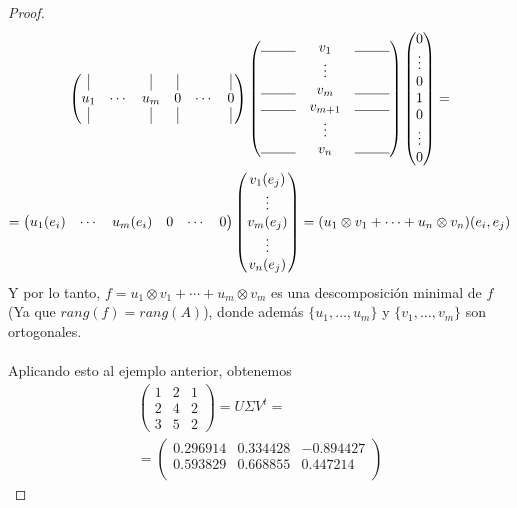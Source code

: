 \documentclass[12pt]{article}
\theoremstyle{break}
\newtheorem*{proof}{Demostración}
\begin{document}
\begin{proof}
\begin{gather*}
\begin{pmatrix}
		\vline & & \vline & \vline & & \vline \\
		u_1 & \cdots & u_m & 0 & \cdots & 0 \\
		\vline & & \vline & \vline & & \vline
		\end{pmatrix} \begin{pmatrix}
		\line(1,0){25} & v_1 & \line(1,0){25} \\
		& \vdots & \\
		\line(1,0){25} & v_m & \line(1,0){25} \\
		\line(1,0){25} & v_{m+1} & \line(1,0){25} \\
		& \vdots & \\
		\line(1,0){25} & v_n & \line(1,0){25}
		\end{pmatrix}
		\begin{pmatrix}
			0 \\ \vdots \\ 0 \\ 1 \\ 0 \\ \vdots \\ 0
		\end{pmatrix} = \\
		= \begin{pmatrix}
			u_1(e_i) & \cdots & u_m(e_i) & 0 & \cdots & 0
		\end{pmatrix} \begin{pmatrix}
			v_1(e_j) \\ \vdots \\ v_m(e_j) \\ \vdots \\ v_n(e_j)
		\end{pmatrix} =
		(u_1 \otimes v_1 + \cdots + u_n \otimes v_n) (e_i,e_j)
	\end{gather*}
	Y por lo tanto, $f = u_1 \otimes v_1 + \cdots + u_m \otimes v_m$ es una descomposición
	minimal de $f$ (Ya que $rang(f)=rang(A)$), donde además $\{u_1,\dots,u_m\}$ y
	$\{v_1,\dots,v_m\}$ son ortogonales.\\ \\
	Aplicando esto al ejemplo anterior, obtenemos
	\begin{gather*}
		\begin{pmatrix}
			1 & 2 & 1 \\ 2 & 4 & 2 \\ 3 & 5 & 2
		\end{pmatrix} = U\Sigma V^t = \\ =\begin{pmatrix}
			0.296914 & 0.334428 & -0.894427 \\ 0.593829 & 0.668855 & 0.447214 \\

\end{pmatrix}
\end{gather*}
\end{proof}
\end{document}
